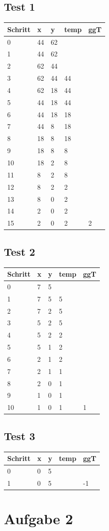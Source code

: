 \documentclass[]{article}
\begin{document}
\subsection{Test 1}\label{test-1}

\begin{longtable}[c]{@{}lllll@{}}
\toprule
Schritt & x & y & temp & ggT\tabularnewline
\midrule
\endhead
0 & 44 & 62 & &\tabularnewline
1 & 44 & 62 & &\tabularnewline
2 & 62 & 44 & &\tabularnewline
3 & 62 & 44 & 44 &\tabularnewline
4 & 62 & 18 & 44 &\tabularnewline
5 & 44 & 18 & 44 &\tabularnewline
6 & 44 & 18 & 18 &\tabularnewline
7 & 44 & 8 & 18 &\tabularnewline
8 & 18 & 8 & 18 &\tabularnewline
9 & 18 & 8 & 8 &\tabularnewline
10 & 18 & 2 & 8 &\tabularnewline
11 & 8 & 2 & 8 &\tabularnewline
12 & 8 & 2 & 2 &\tabularnewline
13 & 8 & 0 & 2 &\tabularnewline
14 & 2 & 0 & 2 &\tabularnewline
15 & 2 & 0 & 2 & 2\tabularnewline
\bottomrule
\end{longtable}

\subsection{Test 2}\label{test-2}

\begin{longtable}[c]{@{}lllll@{}}
\toprule
Schritt & x & y & temp & ggT\tabularnewline
\midrule
\endhead
0 & 7 & 5 & &\tabularnewline
1 & 7 & 5 & 5 &\tabularnewline
2 & 7 & 2 & 5 &\tabularnewline
3 & 5 & 2 & 5 &\tabularnewline
4 & 5 & 2 & 2 &\tabularnewline
5 & 5 & 1 & 2 &\tabularnewline
6 & 2 & 1 & 2 &\tabularnewline
7 & 2 & 1 & 1 &\tabularnewline
8 & 2 & 0 & 1 &\tabularnewline
9 & 1 & 0 & 1 &\tabularnewline
10 & 1 & 0 & 1 & 1\tabularnewline
\bottomrule
\end{longtable}

\subsection{Test 3}\label{test-3}

\begin{longtable}[c]{@{}lllll@{}}
\toprule
Schritt & x & y & temp & ggT\tabularnewline
\midrule
\endhead
0 & 0 & 5 & &\tabularnewline
1 & 0 & 5 & & -1\tabularnewline
\bottomrule
\end{longtable}

\section{Aufgabe 2}\label{aufgabe-2}
\end{document}
